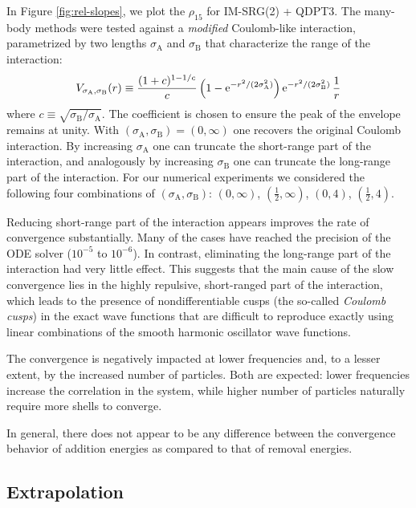 In Figure \ref{fig:rel-slopes}, we plot the $\rho_{15}$ for IM-SRG(2) + QDPT3.  The many-body methods were tested against a \emph{modified} Coulomb-like interaction, parametrized by two lengths $\sigma_{\mathrm{A}}$ and $\sigma_{\mathrm{B}}$ that characterize the range of the interaction:
\begin{align}
  V_{\sigma_{\mathrm{A}}, \sigma_{\mathrm{B}}}(r) \equiv \frac{(1 + c)^{1 - 1/c}}{c} \left(1 - \operatorname{e}^{-r^2 / (2 \sigma_{\mathrm{A}}^2)}\right) \operatorname{e}^{-r^2 / (2 \sigma_{\mathrm{B}}^2)} \frac{1}{r}
\end{align}
where $c \equiv \sqrt{\sigma_{\mathrm{B}} / \sigma_{\mathrm{A}}}$.  The coefficient is chosen to ensure the peak of the envelope remains at unity.  With $(\sigma_{\mathrm{A}}, \sigma_{\mathrm{B}}) = (0, \infty)$ one recovers the original Coulomb interaction.  By increasing $\sigma_{\mathrm{A}}$ one can truncate the short-range part of the interaction, and analogously by increasing $\sigma_{\mathrm{B}}$ one can truncate the long-range part of the interaction.  For our numerical experiments we considered the following four combinations of $(\sigma_{\mathrm{A}}, \sigma_{\mathrm{B}})$: $(0, \infty)$, $(\frac{1}{2}, \infty)$, $(0, 4)$, $(\frac{1}{2}, 4)$.

Reducing short-range part of the interaction appears improves the rate of convergence substantially.  Many of the cases have reached the precision of the ODE solver ($10^{-5}$ to $10^{-6}$).  In contrast, eliminating the long-range part of the interaction had very little effect.  This suggests that the main cause of the slow convergence lies in the highly repulsive, short-ranged part of the interaction, which leads to the presence of nondifferentiable cusps (the so-called \textit{Coulomb cusps}) in the exact wave functions that are difficult to reproduce exactly using linear combinations of the smooth harmonic oscillator wave functions.

The convergence is negatively impacted at lower frequencies and, to a lesser extent, by the increased number of particles.  Both are expected: lower frequencies increase the correlation in the system, while higher number of particles naturally require more shells to converge.

In general, there does not appear to be any difference between the convergence behavior of addition energies as compared to that of removal energies.

\subsection{Extrapolation}
\label{subsec:extrapolation}

